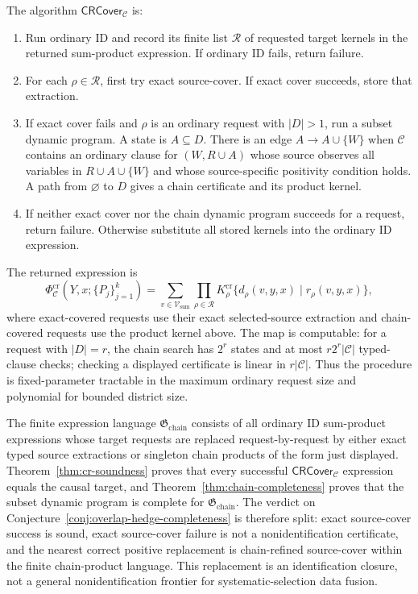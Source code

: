 \documentclass[11pt]{article}
\theoremstyle{definition}
\theoremstyle{plain}
\theoremstyle{remark}
\begin{document}
The algorithm \(\mathsf{CRCover}_{\mathcal C}\) is:
\begin{enumerate}[leftmargin=*]
\item Run ordinary ID and record its finite list \(\mathcal R\) of requested
target kernels in the returned sum-product expression.  If ordinary ID fails,
return failure.
\item For each \(\rho\in\mathcal R\), first try exact source-cover.  If exact
cover succeeds, store that extraction.
\item If exact cover fails and \(\rho\) is an ordinary request with
\(|D|>1\), run a subset dynamic program.  A state is
\(A\subseteq D\).  There is an edge \(A\to A\cup\{W\}\) when
\(\mathcal C\) contains an ordinary clause for
\((W,R\cup A)\) whose source observes all variables in \(R\cup A\cup\{W\}\)
and whose source-specific positivity condition holds.  A path from
\(\varnothing\) to \(D\) gives a chain certificate and its product kernel.
\item If neither exact cover nor the chain dynamic program succeeds for a
request, return failure.  Otherwise substitute all stored kernels into the
ordinary ID expression.
\end{enumerate}
The returned expression is
\[
  \Phi^{\mathrm{cr}}_{\mathcal C}(Y,x;\{P_j\}_{j=1}^k)
  =
  \sum_{v\in\mathcal V_{\mathrm{sum}}}
    \prod_{\rho\in\mathcal R}
      K^{\mathrm{cr}}_\rho
      \{d_\rho(v,y,x)\mid r_\rho(v,y,x)\},
\]
where exact-covered requests use their exact selected-source extraction and
chain-covered requests use the product kernel above.  The map is computable:
for a request with \(|D|=r\), the chain search has \(2^r\) states and at most
\(r2^r|\mathcal C|\) typed-clause checks; checking a displayed certificate is
linear in \(r|\mathcal C|\).  Thus the procedure is fixed-parameter
tractable in the maximum ordinary request size and polynomial for bounded
district size.

The finite expression language \(\mathfrak G_{\mathrm{chain}}\) consists of
all ordinary ID sum-product expressions whose target requests are replaced
request-by-request by either exact typed source extractions or singleton
chain products of the form just displayed.  Theorem~\ref{thm:cr-soundness}
proves that every successful \(\mathsf{CRCover}_{\mathcal C}\) expression
equals the causal target, and Theorem~\ref{thm:chain-completeness} proves that
the subset dynamic program is complete for \(\mathfrak G_{\mathrm{chain}}\).
The verdict on Conjecture~\ref{conj:overlap-hedge-completeness} is therefore
split: exact source-cover success is sound, exact source-cover failure is not
a nonidentification certificate, and the nearest correct positive replacement
is chain-refined source-cover within the finite chain-product language.  This
replacement is an identification closure, not a general nonidentification
frontier for systematic-selection data fusion.
\end{document}
